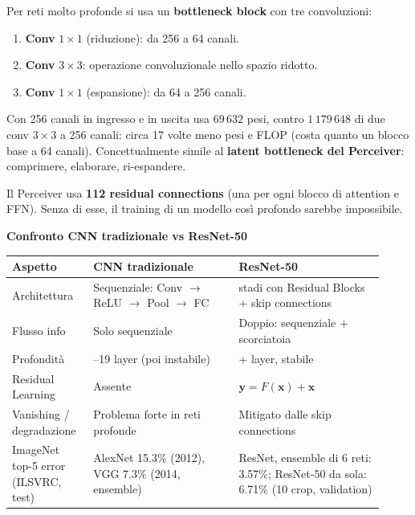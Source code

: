 \documentclass[
  11pt,
]{article}
\newcounter{none} %
\begin{document}
\begin{notabox}[title={\textbf{Bottleneck block (ResNet-50+)}}]
Per reti molto profonde si usa un \textbf{bottleneck block} con tre convoluzioni:
\begin{enumerate}
\item \textbf{Conv} $1 \times 1$ (riduzione): da 256 a 64 canali.
\item \textbf{Conv} $3 \times 3$: operazione convoluzionale nello spazio ridotto.
\item \textbf{Conv} $1 \times 1$ (espansione): da 64 a 256 canali.
\end{enumerate}
Con 256 canali in ingresso e in uscita usa $69\,632$ pesi, contro $1\,179\,648$ di due conv $3\times3$ a 256 canali: circa 17 volte meno pesi e FLOP (costa quanto un blocco base a 64 canali). Concettualmente simile al \textbf{latent bottleneck del Perceiver}: comprimere, elaborare, ri-espandere.
\end{notabox}

\begin{notabox}[title={\textbf{Collegamento al Perceiver}}]
Il Perceiver usa \textbf{112 residual connections} (una per ogni blocco di attention e FFN). Senza di esse, il training di un modello così profondo sarebbe impossibile.
\end{notabox}

\textbf{Confronto CNN tradizionale vs ResNet-50}

{\def\LTcaptype{none}
\begin{longtable}{@{}
  >{\raggedright\arraybackslash}p{0.20\linewidth}
  >{\raggedright\arraybackslash}p{0.36\linewidth}
  >{\raggedright\arraybackslash}p{0.36\linewidth}@{}}
\toprule
\textbf{Aspetto} & \textbf{CNN tradizionale} & \textbf{ResNet-50} \\
\midrule\endhead
\bottomrule\endlastfoot
Architettura & Sequenziale: Conv $\to$ ReLU $\to$ Pool $\to$ FC & 5 stadi con Residual Blocks + skip connections \\
Flusso info & Solo sequenziale & Doppio: sequenziale + scorciatoia \\
Profondit\`a & 5--19 layer (poi instabile) & 50+ layer, stabile \\
Residual Learning & Assente & $\mathbf{y} = F(\mathbf{x}) + \mathbf{x}$ \\
Vanishing / degradazione & Problema forte in reti profonde & Mitigato dalle skip connections \\
ImageNet top-5 error (ILSVRC, test) & AlexNet 15.3\% (2012), VGG 7.3\% (2014, ensemble) & ResNet, ensemble di 6 reti: 3.57\%; ResNet-50 da sola: 6.71\% (10 crop, validation) \\
\end{longtable}
}
\end{document}
